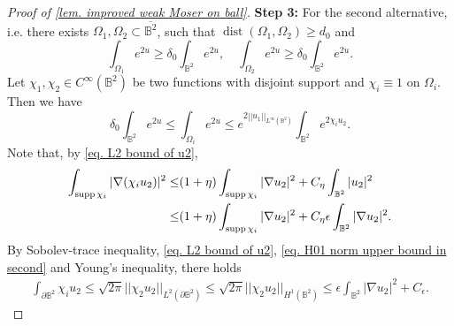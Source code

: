 \documentclass[10pt,a4paper]{amsart}
\begin{document}
\begin{proof}[Proof of \cref{lem. improved weak Moser on ball}]
        {\bf Step 3:} For the second alternative, i.e. there exists $\Omega_1,\Omega_2\subset \overline{\mathbb{B}^2}$, such that $\operatorname{dist}(\Omega_1,\Omega_2)\geq d_0$ and
        \[
        \int_{\Omega_1}e^{2u}
        \geq \delta_0
        \int_{\mathbb{B}^2}e^{2u},\quad
        \int_{\Omega_2}e^{2u}
        \geq \delta_0
        \int_{\mathbb{B}^2}e^{2u}.
        \]
        Let $\chi_1,\chi_2\in C^\infty(\mathbb{B}^2)$ be two functions with disjoint support and $\chi_i\equiv 1$ on $\Omega_i$. Then we have
        \begin{equation}\label{eq. area upper bound in second alternative}
            \delta_0 \int_{\mathbb{B}^2}e^{2u}
        \leq \int_{\Omega_i}e^{2u}
        \leq e^{2||u_1||
        _{L^\infty(\mathbb{B}^2)}}
        \int_{\mathbb{B}^2}
        e^{2\chi_i u_2}.
        \end{equation}
        Note that, by \cref{eq. L2 bound of u2},
        \begin{align}
            \int_{\operatorname{supp}\chi_i}
            |\nabla(\chi_i u_2)|^2
        \leq& (1+\eta)
        \int_{\operatorname{supp}\chi_i}
        |\nabla u_2|^2
        +C_\eta\int_{\mathbb{B}^2}|u_2|^2\notag
        \\
        \leq& (1+\eta)
        \int_{\operatorname{supp}\chi_i}|\nabla u_2|^2
        +C_\eta\epsilon
        \int_{\mathbb{B}^2}|\nabla u_2|^2.
        \label{eq. H01 norm upper bound in second}
        \end{align}
        By Sobolev-trace inequality, \cref{eq. L2 bound of u2}, \cref{eq. H01 norm upper bound in second} and Young's inequality, there holds
        \begin{align}
        \label{eq. upper bound of trace}
            \int_{\partial\mathbb{B}^2}\chi_i u_2
            \leq \sqrt{2\pi}
            ||\chi_2u_2||
            _{L^2(\partial \mathbb{B}^2)}
            \leq \sqrt{2\pi}
            ||\chi_2u_2||
            _{H^{1}(\mathbb{B}^2)}
            \leq \epsilon \int_{\mathbb{B}^2}
            |\nabla u_2|^2+C_\epsilon.
        \end{align}
        


\end{proof}
\end{document}

